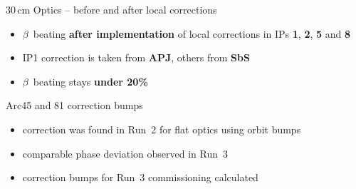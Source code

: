 \documentclass[4pt,usenames,dvipsnames,aspectratio=169,table]{beamer}
\newcommand{\highl}[1]{\textbf{#1}}
\newcommand{\bonelabel}{%
        \node at ($(b1) +(-0.13\linewidth, 0.16\linewidth)$) {\sffamily\small\textbf{Beam 1}};
}
\newcommand{\btwolabel}{%
        \node at ($(b1) +(-0.13\linewidth, 0.16\linewidth)$) {\sffamily\small\textbf{Beam 2}};
}
\begin{document}
\begin{frame}{30\,cm Optics -- before and after local corrections}

    \begin{center}
        \hfill
    \end{center}
    
    \begin{itemize}
        \item $\beta$~beating \highl{after implementation} of local corrections in IPs \textbf{1}, \textbf{2}, \textbf{5} and \textbf{8}
        \item IP1 correction is taken from \highl{APJ}, others from \highl{SbS}
        \item $\beta$~beating stays \highl{under 20\%}
    \end{itemize}
    
\end{frame}


\begin{frame}{Arc45 and 81 correction bumps}


\begin{itemize}
    \item correction was found in Run~2 for flat optics using orbit bumps
    \item comparable phase deviation observed in Run~3
    \item correction bumps for Run~3 commissioning calculated
\end{itemize}
    
\end{frame}
\end{document}
